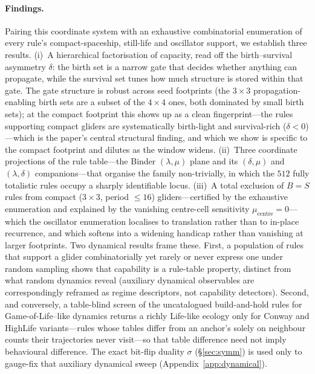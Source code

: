 \documentclass{article}
\begin{document}
\paragraph{Findings.}
Pairing this coordinate system with an exhaustive combinatorial enumeration of
every rule's compact-spaceship, still-life and oscillator support, we establish
three results. (i)~A hierarchical factorisation of capacity, read off the
birth--survival asymmetry $\delta$: the birth set is a narrow gate that decides
whether anything can propagate, while the survival set tunes how much structure
is stored within that gate. The gate structure is robust across seed footprints
(the $3{\times}3$ propagation-enabling birth sets are a subset of the
$4{\times}4$ ones, both dominated by small birth sets); at the compact footprint
this shows up as a clean fingerprint---the rules supporting compact gliders are
systematically birth-light and survival-rich ($\delta<0$)---which is the paper's
central structural finding, and which we show is specific to the compact footprint
and dilutes as the window widens. (ii)~Three coordinate projections of the rule
table---the Binder $(\lambda,\mu)$ plane and its $(\delta,\mu)$ and
$(\lambda,\delta)$ companions---that organise the family non-trivially, in which
the $512$ fully totalistic rules occupy a sharply identifiable locus. (iii)~A
total exclusion of $B=S$ rules from compact ($3{\times}3$, period $\le16$)
gliders---certified by the exhaustive enumeration and explained by the vanishing
centre-cell sensitivity $\mu_{\text{centre}}=0$---which the oscillator enumeration
localises to translation rather than to in-place recurrence, and which softens
into a widening handicap rather than vanishing at larger footprints. Two
dynamical results frame these. First, a population of rules that support a glider
combinatorially yet rarely or never express one under random sampling shows that
capability is a rule-table property, distinct from what random dynamics reveal
(auxiliary dynamical observables are correspondingly reframed as regime
descriptors, not capability detectors). Second, and conversely, a table-blind
screen of the uncatalogued build-and-hold rules for Game-of-Life--like dynamics
returns a richly Life-like ecology only for Conway and HighLife variants---rules
whose tables differ from an anchor's solely on neighbour counts their trajectories
never visit---so that table difference need not imply behavioural difference. The
exact bit-flip
duality $\sigma$ (\S\ref{sec:symm}) is used only to gauge-fix that auxiliary
dynamical sweep (Appendix~\ref{app:dynamical}).
\end{document}
